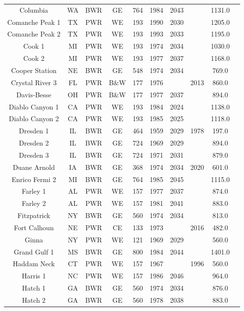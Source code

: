 \begin{table}[h!]
\begin{tabular}{c c c c c c c c c c}
    Columbia & WA & BWR & GE & 764 & 1984 & 2043 &  & 1131.0 \\
    Comanche Peak 1 & TX & PWR & WE & 193 & 1990 & 2030 &  & 1205.0 \\
    Comanche Peak 2 & TX & PWR & WE & 193 & 1993 & 2033 &  & 1195.0 \\
    Cook 1 & MI & PWR & WE & 193 & 1974 & 2034 &  & 1030.0 \\
    Cook 2 & MI & PWR & WE & 193 & 1977 & 2037 &  & 1168.0 \\
    Cooper Station & NE & BWR & GE & 548 & 1974 & 2034 &  & 769.0 \\
    Crystal River 3 & FL & PWR & B\&W & 177 & 1976 &  & 2013 & 860.0 \\
    Davis-Besse & OH & PWR & B\&W & 177 & 1977 & 2037 &  & 894.0 \\
    Diablo Canyon 1 & CA & PWR & WE & 193 & 1984 & 2024 &  & 1138.0 \\
    Diablo Canyon 2 & CA & PWR & WE & 193 & 1985 & 2025 &  & 1118.0 \\
    Dresden 1 & IL & BWR & GE & 464 & 1959 & 2029 & 1978 & 197.0 \\
    Dresden 2 & IL & BWR & GE & 724 & 1969 & 2029 &  & 894.0 \\
    Dresden 3 & IL & BWR & GE & 724 & 1971 & 2031 &  & 879.0 \\
    Duane Arnold & IA & BWR & GE & 368 & 1974 & 2034 & 2020 & 601.0 \\
    Enrico Fermi 2 & MI & BWR & GE & 764 & 1985 & 2045 &  & 1115.0 \\
    Farley 1 & AL & PWR & WE & 157 & 1977 & 2037 &  & 874.0 \\
    Farley 2 & AL & PWR & WE & 157 & 1981 & 2041 &  & 883.0 \\
    Fitzpatrick & NY & BWR & GE & 560 & 1974 & 2034 &  & 813.0 \\
    Fort Calhoun & NE & PWR & CE & 133 & 1973 &  & 2016 & 482.0 \\
    Ginna & NY & PWR & WE & 121 & 1969 & 2029 &  & 560.0 \\
    Grand Gulf 1 & MS & BWR & GE & 800 & 1984 & 2044 &  & 1401.0 \\
    Haddam Neck & CT & PWR & WE & 157 & 1967 &  & 1996 & 560.0 \\
    Harris 1 & NC & PWR & WE & 157 & 1986 & 2046 &  & 964.0 \\
    Hatch 1 & GA & BWR & GE & 560 & 1974 & 2034 &  & 876.0 \\
    Hatch 2 & GA & BWR & GE & 560 & 1978 & 2038 &  & 883.0 \\

\end{tabular}
\end{table}
